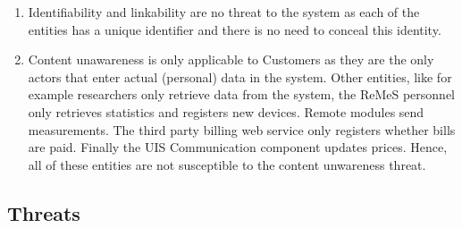 \begin{enumerate}
  \item Identifiability and linkability are no threat to the system as each
  of the entities has a unique identifier and there is no need to conceal this
  identity. 
  \item Content unawareness is only applicable to Customers as they are the only
  actors that enter actual (personal) data in the system. Other entities, like
  for example researchers only retrieve data from the system, the ReMeS
  personnel only retrieves statistics and registers new devices. Remote modules
  send measurements. The third party billing web service only registers whether
  bills are paid. Finally the UIS Communication component updates prices.
  Hence, all of these entities are not susceptible to the content unwareness
  threat.
\end{enumerate}

\subsection{Threats}

